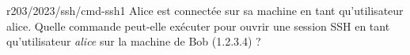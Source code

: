 \begin{question}{r203/2023/ssh/cmd-ssh1}
  Alice est connectée sur sa machine en tant qu'utilisateur
  alice. Quelle commande peut-elle exécuter pour ouvrir une session
  SSH en tant qu'utilisateur {\em alice} sur la machine de Bob
  (1.2.3.4) ?
  \begin{reponses}[3]
    \lastchoices
  \end{reponses}
\end{question}
